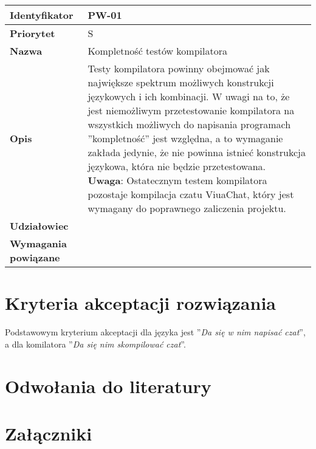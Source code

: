 \documentclass[11pt,oneside,a4paper,titlepage,onecolumn]{article}
\begin{document}
\vspace{1em}

\begin{tabular}{ | l | l | }
    \hline
    \textbf{Identyfikator} & \parbox[t]{11cm}{PW-01} \\
    \hline
    \textbf{Priorytet} & S \\
    \hline
    \textbf{Nazwa} & Kompletność testów kompilatora \\
    \hline
    \textbf{Opis} & \parbox[t]{11cm}{
        Testy kompilatora powinny obejmować jak największe spektrum możliwych konstrukcji językowych i
        ich kombinacji. W uwagi na to, że jest niemożliwym przetestowanie kompilatora na wszystkich
        możliwych do napisania programach ''kompletność'' jest względna, a to wymaganie zakłada jedynie, że
        nie powinna istnieć konstrukcja językowa, która nie będzie przetestowana. \\
        \textbf{Uwaga}: Ostatecznym testem kompilatora pozostaje kompilacja czatu ViuaChat, który jest
        wymagany do poprawnego zaliczenia projektu.
    } \\
    \hline
    \textbf{Udziałowiec} & \phantom{} \\
    \hline
    \textbf{Wymagania powiązane} & \phantom{} \\
    \hline
\end{tabular}

\section{Kryteria akceptacji rozwiązania}

Podstawowym kryterium akceptacji dla języka jest ''\emph{Da się w nim napisać czat}'', a
dla komilatora ''\emph{Da się nim skompilować czat}''.

\section{Odwołania do literatury}

\section{Załączniki}


\end{document}
